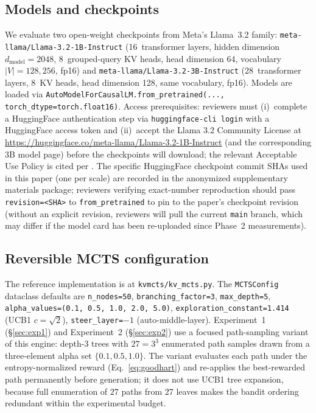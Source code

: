 \subsection{Models and checkpoints}
We evaluate two open-weight checkpoints from Meta's Llama~3.2 family: \texttt{meta-llama/Llama-3.2-1B-Instruct} (16~transformer layers, hidden dimension $d_{\text{model}} = 2048$, 8~grouped-query KV heads, head dimension 64, vocabulary $|V| = 128{,}256$, fp16) and \texttt{meta-llama/Llama-3.2-3B-Instruct} (28~transformer layers, 8~KV heads, head dimension 128, same vocabulary, fp16). Models are loaded via \texttt{AutoModelForCausalLM.from\_pretrained(..., torch\_dtype=torch.float16)}. Access prerequisites: reviewers must (i)~complete a HuggingFace authentication step via \texttt{huggingface-cli login} with a HuggingFace access token and (ii)~accept the Llama 3.2 Community License at \url{https://huggingface.co/meta-llama/Llama-3.2-1B-Instruct} (and the corresponding 3B model page) before the checkpoints will download; the relevant Acceptable Use Policy is cited per \cite{meta2024llama3_2_aup}. The specific HuggingFace checkpoint commit SHAs used in this paper (one per scale) are recorded in the anonymized supplementary materials package; reviewers verifying exact-number reproduction should pass \texttt{revision=<SHA>} to \texttt{from\_pretrained} to pin to the paper's checkpoint revision (without an explicit revision, reviewers will pull the current \texttt{main} branch, which may differ if the model card has been re-uploaded since Phase~2 measurements).

\subsection{Reversible MCTS configuration}
The reference implementation is at \texttt{kvmcts/kv\_mcts.py}. The \texttt{MCTSConfig} dataclass defaults are \texttt{n\_nodes=50}, \texttt{branching\_factor=3}, \texttt{max\_depth=5}, \texttt{alpha\_values=(0.1, 0.5, 1.0, 2.0, 5.0)}, \texttt{exploration\_constant=1.414} (UCB1 $c = \sqrt{2}$), \texttt{steer\_layer=$-1$} (auto-middle-layer). Experiment~1 (§\ref{sec:exp1}) and Experiment~2 (§\ref{sec:exp2}) use a focused path-sampling variant of this engine: depth-$3$ trees with $27 = 3^3$ enumerated path samples drawn from a three-element alpha set $\{0.1, 0.5, 1.0\}$. The variant evaluates each path under the entropy-normalized reward (Eq.~\ref{eq:goodhart}) and re-applies the best-rewarded path permanently before generation; it does not use UCB1 tree expansion, because full enumeration of $27$ paths from $27$ leaves makes the bandit ordering redundant within the experimental budget.

